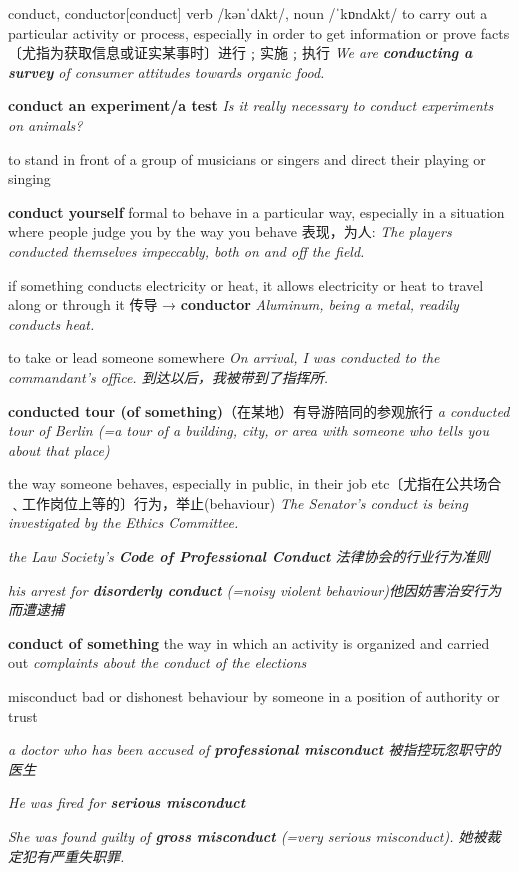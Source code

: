 \begin{DefWord}{conduct, conductor}[conduct]
    verb /kənˈdʌkt/, noun  /ˈkɒndʌkt/ 
    to carry out a particular activity or process, especially in order to get information or prove facts 〔尤指为获取信息或证实某事时〕进行﹔实施﹔执行
    \textit{We are \textbf{conducting a survey} of consumer attitudes towards organic food.}

    \textbf{conduct an experiment/a test}
    \textit{Is it really necessary to conduct experiments on animals?}

    to stand in front of a group of musicians or singers and direct their playing or singing

    \textbf{conduct yourself} formal to behave in a particular way, especially in a situation where people judge you by the way you behave 表现，为人:
    \textit{The players conducted themselves impeccably, both on and off the field.}


    if something conducts electricity or heat, it allows electricity or heat to travel along or through it 传导 → \textbf{conductor}
    \textit{Aluminum, being a metal, readily conducts heat.}

    to take or lead someone somewhere
    \textit{On arrival, I was conducted to the commandant’s office. 到达以后，我被带到了指挥所. }

    \textbf{conducted tour (of something)}（在某地）有导游陪同的参观旅行
    \textit{a conducted tour of Berlin (=a tour of a building, city, or area with someone who tells you about that place)}

    the way someone behaves, especially in public, in their job etc〔尤指在公共场合﹑工作岗位上等的〕行为，举止(behaviour)
    \textit{The Senator’s conduct is being investigated by the Ethics Committee.}

    \textit{the Law Society’s \textbf{Code of Professional Conduct} 法律协会的行业行为准则}

    \textit{his arrest for \textbf{disorderly conduct} (=noisy violent behaviour)他因妨害治安行为而遭逮捕}

    \textbf{conduct of something} the way in which an activity is organized and carried out
   \textit{complaints about the conduct of the elections}
\end{DefWord}

\begin{DefWord}{misconduct}
    bad or dishonest behaviour by someone in a position of authority or trust

    \textit{a doctor who has been accused of \textbf{professional misconduct} 被指控玩忽职守的医生}

    \textit{He was fired for \textbf{serious misconduct}}

    \textit{She was found guilty of \textbf{gross misconduct} (=very serious misconduct). 她被裁定犯有严重失职罪. }
\end{DefWord}

